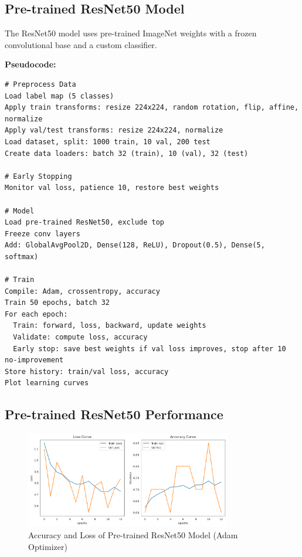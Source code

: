 \documentclass[a4paper,12pt]{article}
\begin{document}
\clearpage %

\subsection*{Pre-trained ResNet50 Model}
The ResNet50 model uses pre-trained ImageNet weights with a frozen convolutional base and a custom classifier.

\textbf{Pseudocode:}
\begin{verbatim}
# Preprocess Data
Load label map (5 classes)
Apply train transforms: resize 224x224, random rotation, flip, affine, normalize
Apply val/test transforms: resize 224x224, normalize
Load dataset, split: 1000 train, 10 val, 200 test
Create data loaders: batch 32 (train), 10 (val), 32 (test)

# Early Stopping
Monitor val loss, patience 10, restore best weights

# Model
Load pre-trained ResNet50, exclude top
Freeze conv layers
Add: GlobalAvgPool2D, Dense(128, ReLU), Dropout(0.5), Dense(5, softmax)

# Train
Compile: Adam, crossentropy, accuracy
Train 50 epochs, batch 32
For each epoch:
  Train: forward, loss, backward, update weights
  Validate: compute loss, accuracy
  Early stop: save best weights if val loss improves, stop after 10 no-improvement
Store history: train/val loss, accuracy
Plot learning curves
\end{verbatim}

\subsection*{Pre-trained ResNet50 Performance}
\begin{figure}[H]
    \centering
    \includegraphics[width=0.8\textwidth]{assets/cassava/resnet_50.png}
    \caption{Accuracy and Loss of Pre-trained ResNet50 Model (Adam Optimizer)}
\end{figure}
\end{document}
